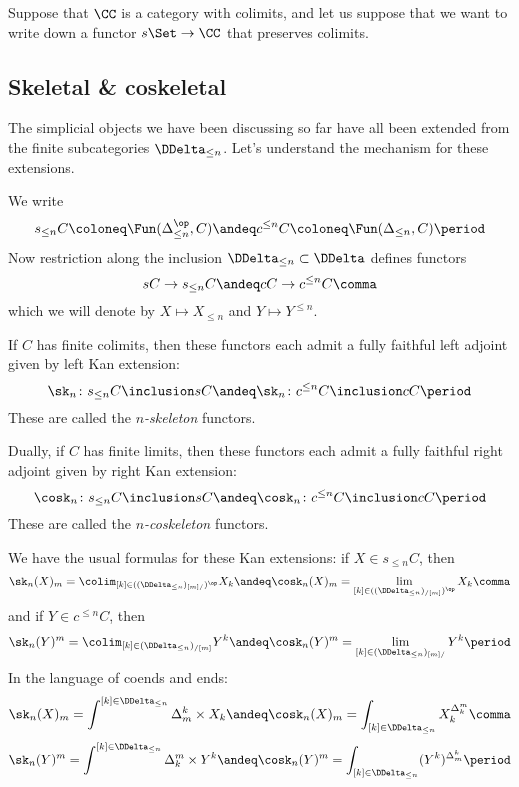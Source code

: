 Suppose that $\CC$ is a category with colimits, and
let us suppose that we want to write down a functor $s\Set \to \CC$ that preserves colimits.


\subsection{Skeletal \& coskeletal}%
\label{sub:Skeletalandcoskeletal}

The simplicial objects we have been discussing so far have all been extended from the finite subcategories $\DDelta_{\leq n}$.
Let's understand the mechanism for these extensions.

We write
\[
  s_{\leq n}C \coloneq \Fun(\Delta_{\leq n}^{\op}, C)
  \andeq
  c^{\leq n}C \coloneq \Fun(\Delta_{\leq n}, C)
  \period
\]
Now restriction along the inclusion $\DDelta_{\leq n} \subset \DDelta$ defines functors
\[
  sC \to s_{\leq n}C
  \andeq
  cC \to c^{\leq n}C \comma
\]
which we will denote by $X \mapsto X_{\leq n}$ and $Y \mapsto Y^{\leq n}$.

\begin{definition}
  If $C$ has finite colimits, then these functors each admit a fully faithful left adjoint given by left Kan extension:
  \[
    \sk_n \colon s_{\leq n}C \inclusion sC
    \andeq
    \sk_n \colon c^{\leq n}C \inclusion cC \period
  \]
  These are called the \emph{$n$-skeleton} functors.
  
  Dually, if $C$ has finite limits, then these functors each admit a fully faithful right adjoint given by right Kan extension:
  \[
    \cosk_n \colon s_{\leq n}C \inclusion sC
    \andeq
    \cosk_n \colon c^{\leq n}C \inclusion cC \period
  \]
  These are called the \emph{$n$-coskeleton} functors.
\end{definition}

We have the usual formulas for these Kan extensions:
if $X \in s_{\leq n}C$, then
\[
  \sk_n(X)_m = \colim_{[k] \in ((\DDelta_{\leq n})_{[m]/})^{\op}} X_k 
  \andeq
  \cosk_n(X)_m = \lim_{[k] \in ((\DDelta_{\leq n})_{/[m]})^{\op}} X_k \comma
\]
and if $Y \in c^{\leq n}C$, then
\[
  \sk_n(Y)^m = \colim_{[k] \in (\DDelta_{\leq n})_{/[m]}} Y^k 
  \andeq
  \cosk_n(Y)^m = \lim_{[k] \in (\DDelta_{\leq n})_{[m]/}} Y^k \period
\]
In the language of coends and ends:
\[
  \sk_n(X)_m = \int^{[k] \in \DDelta_{\leq n}} \Delta^k_m \times X_k
  \andeq
  \cosk_n(X)_m = \int_{[k] \in \DDelta_{\leq n}} X_k^{\Delta^m_k} \comma
\]
\[
  \sk_n(Y)^m = \int^{[k] \in \DDelta_{\leq n}} \Delta^m_k \times Y^k
  \andeq
  \cosk_n(Y)^m = \int_{[k] \in \DDelta_{\leq n}} (Y^k)^{\Delta^k_m} \period
\]

